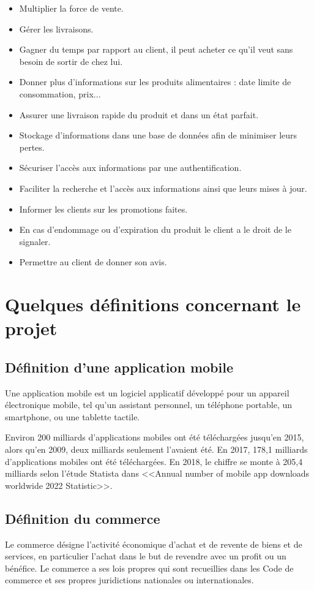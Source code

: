 \documentclass{report}
\begin{document}
\begin{itemize}
    \item Multiplier la force de vente.
    \item Gérer les livraisons.
    \item Gagner du temps par rapport au client, il peut acheter ce qu’il veut sans besoin de sortir de chez lui.
    \item Donner plus d’informations sur les produits alimentaires : date limite de consommation, prix...
    \item Assurer une livraison rapide du produit et dans un état parfait.
    \item Stockage d’informations dans une base de données afin de minimiser leurs pertes.
    \item Sécuriser l’accès aux informations par une authentification.
    \item Faciliter la recherche et l’accès aux informations ainsi que leurs mises à jour.
    \item Informer les clients sur les promotions faites.
    \item En cas d’endommage ou d’expiration du produit le client a le droit de le signaler.
    \item Permettre au client de donner son avis.
\end{itemize}

\section{Quelques définitions concernant le projet}

\subsection{Définition d'une application mobile}
Une application mobile est un logiciel applicatif développé pour un appareil électronique mobile, tel qu'un assistant personnel, un téléphone portable, un smartphone, ou une tablette tactile.

Environ 200 milliards d'applications mobiles ont été téléchargées jusqu'en 2015, alors qu'en 2009, deux milliards seulement l'avaient été. En 2017, 178,1 milliards d'applications mobiles ont été téléchargées. En 2018, le chiffre se monte à 205,4 milliards selon l'étude Statista dans <<Annual number of mobile app downloads worldwide 2022 Statistic>>.

\subsection{Définition du commerce}
Le commerce désigne l'activité économique d'achat et de revente de biens et de services, en particulier l'achat dans le but de revendre avec un profit ou un bénéfice. Le commerce a ses lois propres qui sont recueillies dans les Code de commerce et ses propres juridictions nationales ou internationales.
\end{document}
